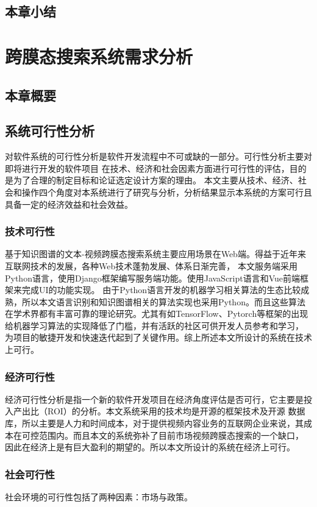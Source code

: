\documentclass[12pt,a4paper,fancyhdr,openany,oneside]{ctexbook}
\begin{document}
\section{本章小结}



\chapter{跨膜态搜索系统需求分析}
\section{本章概要}
\section{系统可行性分析}
对软件系统的可行性分析是软件开发流程中不可或缺的一部分。可行性分析主要对即将进行开发的软件项目
在技术、经济和社会因素方面进行可行性的评估，目的是为了合理的制定目标和论证选定设计方案的理由。\cite{软件项目中的可行性分析方法研究}
本文主要从技术、经济、社会和操作四个角度对本系统进行了研究与分析，分析结果显示本系统的方案可行且具备一定的经济效益和社会效益。


\subsection{技术可行性}
基于知识图谱的文本-视频跨膜态搜索系统主要应用场景在Web端。得益于近年来互联网技术的发展，各种Web技术蓬勃发展、体系日渐完善，
本文服务端采用Python语言，使用Django框架编写服务端功能。使用JavaScript语言和Vue前端框架来完成UI的功能实现。
由于Python语言开发的机器学习相关算法的生态比较成熟，所以本文语言识别和知识图谱相关的算法实现也采用Python。而且这些算法
在学术界都有丰富可靠的理论研究。尤其有如TensorFlow、Pytorch等框架的出现给机器学习算法的实现降低了门槛，并有活跃的社区可供开发人员参考和学习，
为项目的敏捷开发和快速迭代起到了关键作用。综上所述本文所设计的系统在技术上可行。

\subsection{经济可行性}
经济可行性分析是指一个新的软件开发项目在经济角度评估是否可行，它主要是投入产出比（ROI）的分析。本文系统采用的技术均是开源的框架技术及开源
数据库，所以主要是人力和时间成本，对于提供视频内容业务的互联网企业来说，其成本在可控范围内。而且本文的系统弥补了目前市场视频跨膜态搜索的一个缺口，
因此在经济上是有巨大盈利的期望的。所以本文所设计的系统在经济上可行。

\subsection{社会可行性}
社会环境的可行性包括了两种因素：市场与政策。\cite{软件项目中的可行性分析方法研究}
\end{document}
